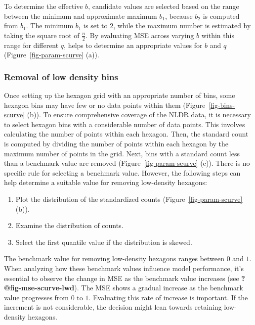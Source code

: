 \documentclass[
  12pt]{article}
\providecommand{\tightlist}{%
  \setlength{\itemsep}{0pt}\setlength{\parskip}{0pt}}\usepackage{longtable,booktabs,array}
\def\tightlist{}
\begin{document}
To determine the effective \(b\), candidate values are selected based on
the range between the minimum and approximate maximum \(b_1\), because
\(b_2\) is computed from \(b_1\). The minimum \(b_1\) is set to \(2\),
while the maximum number is estimated by taking the square root of
\(\frac{n}{2}\). By evaluating MSE across varying \(b\) within this
range for different \(q\), helps to determine an appropriate values for
\(b\) and \(q\) (Figure~\ref{fig-param-scurve} (a)).

\subsubsection{Removal of low density
bins}\label{removal-of-low-density-bins}

Once setting up the hexagon grid with an appropriate number of bins,
some hexagon bins may have few or no data points within them
(Figure~\ref{fig-bins-scurve} (b)). To ensure comprehensive coverage of
the NLDR data, it is necessary to select hexagon bins with a
considerable number of data points. This involves calculating the number
of points within each hexagon. Then, the standard count is computed by
dividing the number of points within each hexagon by the maximum number
of points in the grid. Next, bins with a standard count less than a
benchmark value are removed (Figure~\ref{fig-param-scurve} (c)). There
is no specific rule for selecting a benchmark value. However, the
following steps can help determine a suitable value for removing
low-density hexagons:

\begin{enumerate}
\def\labelenumi{\arabic{enumi}.}
\tightlist
\item
  Plot the distribution of the standardized counts
  (Figure~\ref{fig-param-scurve} (b)).
\item
  Examine the distribution of counts.
\item
  Select the first quantile value if the distribution is skewed.
\end{enumerate}

The benchmark value for removing low-density hexagons ranges between
\(0\) and \(1\). When analyzing how these benchmark values influence
model performance, it's essential to observe the change in MSE as the
benchmark value increases (see \textbf{?@fig-mse-scurve-lwd}). The MSE
shows a gradual increase as the benchmark value progresses from \(0\) to
\(1\). Evaluating this rate of increase is important. If the increment
is not considerable, the decision might lean towards retaining
low-density hexagons.
\end{document}
